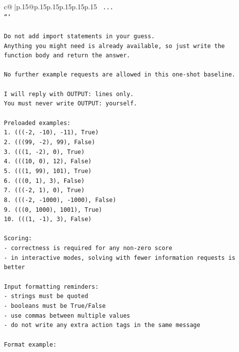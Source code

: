 \documentclass{article}
\begin{document}
{\begin{supertabular}{c@{$\;$}|p{.15\linewidth}@{}p{.15\linewidth}p{.15\linewidth}p{.15\linewidth}p{.15\linewidth}p{.15\linewidth}}
{{{\texttt{    ...} \\
\texttt{```} \\
\\ 
\texttt{Do not add import statements in your guess.} \\
\texttt{Anything you might need is already available, so just write the function body and return the answer.} \\
\\ 
\texttt{No further example requests are allowed in this one{-}shot baseline.} \\
\\ 
\texttt{I will reply with OUTPUT: lines only.} \\
\texttt{You must never write OUTPUT: yourself.} \\
\\ 
\texttt{Preloaded examples:} \\
\texttt{1. ((({-}2, {-}10), {-}11), True)} \\
\texttt{2. (((99, {-}2), 99), False)} \\
\texttt{3. (((1, {-}2), 0), True)} \\
\texttt{4. (((10, 0), 12), False)} \\
\texttt{5. (((1, 99), 101), True)} \\
\texttt{6. (((0, 1), 3), False)} \\
\texttt{7. ((({-}2, 1), 0), True)} \\
\texttt{8. ((({-}2, {-}1000), {-}1000), False)} \\
\texttt{9. (((0, 1000), 1001), True)} \\
\texttt{10. (((1, {-}1), 3), False)} \\
\\ 
\texttt{Scoring:} \\
\texttt{{-} correctness is required for any non{-}zero score} \\
\texttt{{-} in interactive modes, solving with fewer information requests is better} \\
\\ 
\texttt{Input formatting reminders:} \\
\texttt{{-} strings must be quoted} \\
\texttt{{-} booleans must be True/False} \\
\texttt{{-} use commas between multiple values} \\
\texttt{{-} do not write any extra action tags in the same message} \\
\\ 
\texttt{Format example:} \\
}}}
\end{supertabular}}
\end{document}
